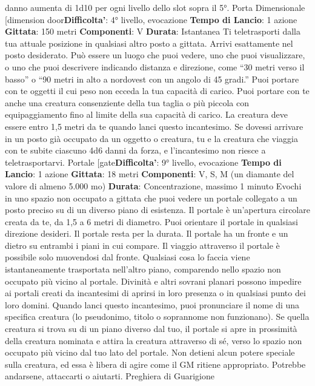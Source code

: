 \begin{multicols}{2}
danno aumenta di 1d10 per ogni livello dello slot sopra
il 5°.
Porta Dimensionale
[dimension door\textbf{Difficolta'}:
4° livello, evocazione
\textbf{Tempo di Lancio}: 1 azione
\textbf{Gittata}: 150 metri
\textbf{Componenti}: V
\textbf{Durata}: Istantanea
Ti teletrasporti dalla tua attuale posizione in qualsiasi
altro posto a gittata. Arrivi esattamente nel posto
desiderato. Può essere un luogo che puoi vedere, uno
che puoi visualizzare, o uno che puoi descrivere
indicando distanza e direzione, come “30 metri verso il
basso” o “90 metri in alto a nordovest con un angolo di
45 gradi.”
Puoi portare con te oggetti il cui peso non ecceda la tua
capacità di carico. Puoi portare con te anche una
creatura consenziente della tua taglia o più piccola con
equipaggiamento fino al limite della sua capacità di
carico. La creatura deve essere entro 1,5 metri da te
quando lanci questo incantesimo.
Se dovessi arrivare in un posto già occupato da un
oggetto o creatura, tu e la creatura che viaggia con te
subite ciascuno 4d6 danni da forza, e l’incantesimo non
riesce a teletrasportarvi.
Portale
[gate\textbf{Difficolta'}:
9° livello, evocazione
\textbf{Tempo di Lancio}: 1 azione
\textbf{Gittata}: 18 metri
\textbf{Componenti}: V, S, M (un diamante del valore di
almeno 5.000 mo)
\textbf{Durata}: Concentrazione, massimo 1 minuto
Evochi in uno spazio non occupato a gittata che puoi
vedere un portale collegato a un posto preciso su di un
diverso piano di esistenza. Il portale è un’apertura
circolare creata da te, da 1,5 a 6 metri di diametro. Puoi
orientare il portale in qualsiasi direzione desideri. Il
portale resta per la durata.
Il portale ha un fronte e un dietro su entrambi i piani in
cui compare. Il viaggio attraverso il portale è possibile
solo muovendosi dal fronte. Qualsiasi cosa lo faccia
viene istantaneamente trasportata nell’altro piano,
comparendo nello spazio non occupato più vicino al
portale.
Divinità e altri sovrani planari possono impedire ai
portali creati da incantesimi di aprirsi in loro presenza o
in qualsiasi punto dei loro domini.
Quando lanci questo incantesimo, puoi pronunciare il
nome di una specifica creatura (lo pseudonimo, titolo o
soprannome non funzionano). Se quella creatura si
trova su di un piano diverso dal tuo, il portale si apre in
prossimità della creatura nominata e attira la creatura
attraverso di sé, verso lo spazio non occupato più vicino
dal tuo lato del portale. Non detieni alcun potere
speciale sulla creatura, ed essa è libera di agire come il
GM ritiene appropriato. Potrebbe andarsene, attaccarti
o aiutarti.
Preghiera di Guarigione

\end{multicols}
